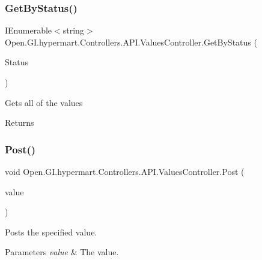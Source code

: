 \subsubsection{\texorpdfstring{Get\+By\+Status()}{GetByStatus()}}
{\footnotesize\ttfamily I\+Enumerable$<$string$>$ Open.\+G\+I.\+hypermart.\+Controllers.\+A\+P\+I.\+Values\+Controller.\+Get\+By\+Status (\begin{DoxyParamCaption}\item[{int}]{Status }\end{DoxyParamCaption})}



Gets all of the values 

\begin{DoxyReturn}{Returns}

\end{DoxyReturn}
\hypertarget{class_open_1_1_g_i_1_1hypermart_1_1_controllers_1_1_a_p_i_1_1_values_controller_a4b0c28944cf2577d0883f17466b45453}{}\label{class_open_1_1_g_i_1_1hypermart_1_1_controllers_1_1_a_p_i_1_1_values_controller_a4b0c28944cf2577d0883f17466b45453} 
\subsubsection{\texorpdfstring{Post()}{Post()}}
{\footnotesize\ttfamily void Open.\+G\+I.\+hypermart.\+Controllers.\+A\+P\+I.\+Values\+Controller.\+Post (\begin{DoxyParamCaption}\item[{\mbox{[}\+From\+Body\mbox{]} string}]{value }\end{DoxyParamCaption})}



Posts the specified value. 


\begin{DoxyParams}{Parameters}
{\em value} & The value.\\
\hline
\end{DoxyParams}
\hypertarget{class_open_1_1_g_i_1_1hypermart_1_1_controllers_1_1_a_p_i_1_1_values_controller_a1639499e0a18f82e61335c94c344ad31}{}\label{class_open_1_1_g_i_1_1hypermart_1_1_controllers_1_1_a_p_i_1_1_values_controller_a1639499e0a18f82e61335c94c344ad31} 

